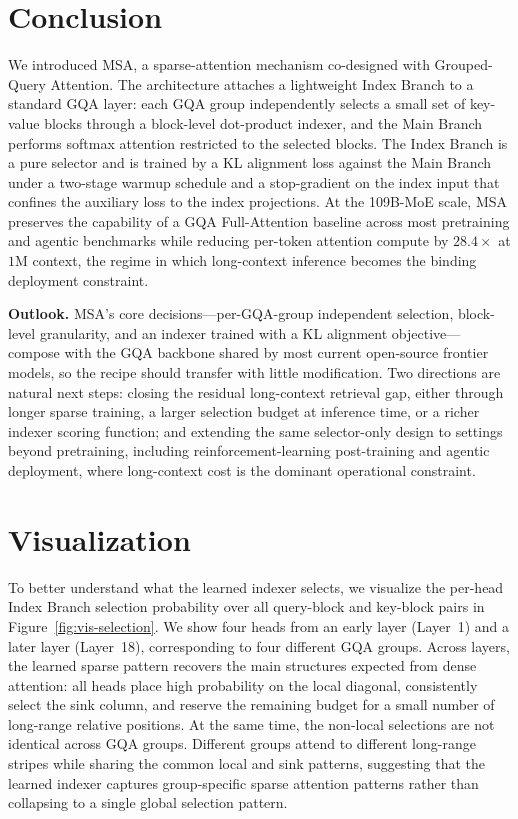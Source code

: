 \documentclass{llmxive}
\providecommand{\method}{\textsc{MSA}}
\providecommand{\Figref}[1]{Figure~\ref{#1}}
\begin{document}
\section{Conclusion}
\label{sec:conclusion}

We introduced \method{}, a sparse-attention mechanism co-designed with Grouped-Query Attention. The architecture attaches a lightweight Index Branch to a standard GQA layer: each GQA group independently selects a small set of key-value blocks through a block-level dot-product indexer, and the Main Branch performs softmax attention restricted to the selected blocks. The Index Branch is a pure selector and is trained by a KL alignment loss against the Main Branch under a two-stage warmup schedule and a stop-gradient on the index input that confines the auxiliary loss to the index projections. At the 109B-MoE scale, \method{} preserves the capability of a GQA Full-Attention baseline across most pretraining and agentic benchmarks while reducing per-token attention compute by $28.4\times$ at $1\mathrm{M}$ context, the regime in which long-context inference becomes the binding deployment constraint.

\textbf{Outlook.}
\method{}'s core decisions---per-GQA-group independent selection, block-level granularity, and an indexer trained with a KL alignment objective---compose with the GQA backbone shared by most current open-source frontier models, so the recipe should transfer with little modification. Two directions are natural next steps: closing the residual long-context retrieval gap, either through longer sparse training, a larger selection budget at inference time, or a richer indexer scoring function; and extending the same selector-only design to settings beyond pretraining, including reinforcement-learning post-training and agentic deployment, where long-context cost is the dominant operational constraint.






\appendix

\section{Visualization}

To better understand what the learned indexer selects, we visualize the per-head Index Branch selection probability over all query-block and key-block pairs in \Figref{fig:vis-selection}. We show four heads from an early layer (Layer~1) and a later layer (Layer~18), corresponding to four different GQA groups. Across layers, the learned sparse pattern recovers the main structures expected from dense attention: all heads place high probability on the local diagonal, consistently select the sink column, and reserve the remaining budget for a small number of long-range relative positions. At the same time, the non-local selections are not identical across GQA groups. Different groups attend to different long-range stripes while sharing the common local and sink patterns, suggesting that the learned indexer captures group-specific sparse attention patterns rather than collapsing to a single global selection pattern.
\end{document}
